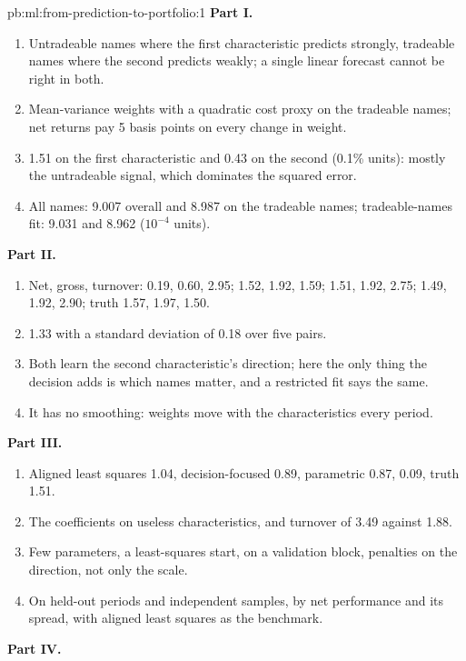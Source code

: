 \begin{solution}{pb:ml:from-prediction-to-portfolio:1}
\textbf{Part I.}
\begin{enumerate}
\item Untradeable names where the first characteristic predicts strongly, tradeable names where the second predicts weakly; a
single linear forecast cannot be right in both.
\item Mean-variance weights with a quadratic cost proxy on the tradeable names; net returns pay 5 basis points on every change
in weight.
\item 1.51 on the first characteristic and 0.43 on the second (0.1\% units): mostly the untradeable signal, which dominates the
squared error.
\item All names: 9.007 overall and 8.987 on the tradeable names; tradeable-names fit: 9.031 and 8.962 ($10^{-4}$ units).
\end{enumerate}
\textbf{Part II.}
\begin{enumerate}[resume]
\item Net, gross, turnover: 0.19, 0.60, 2.95; 1.52, 1.92, 1.59; 1.51, 1.92, 2.75; 1.49, 1.92, 2.90; truth 1.57, 1.97, 1.50.
\item 1.33 with a standard deviation of 0.18 over five pairs.
\item Both learn the second characteristic's direction; here the only thing the decision adds is which names matter, and a
restricted fit says the same.
\item It has no smoothing: weights move with the characteristics every period.
\end{enumerate}
\textbf{Part III.}
\begin{enumerate}[resume]
\item Aligned least squares 1.04, decision-focused 0.89, parametric 0.87,  0.09, truth 1.51.
\item The coefficients on useless characteristics, and turnover of 3.49 against 1.88.
\item Few parameters, a least-squares start,  on a validation block, penalties on the direction, not only the
scale.
\item On held-out periods and independent samples, by net performance and its spread, with aligned least squares as the
benchmark.
\end{enumerate}
\textbf{Part IV.}
\begin{enumerate}[resume]

\end{enumerate}
\end{solution}
